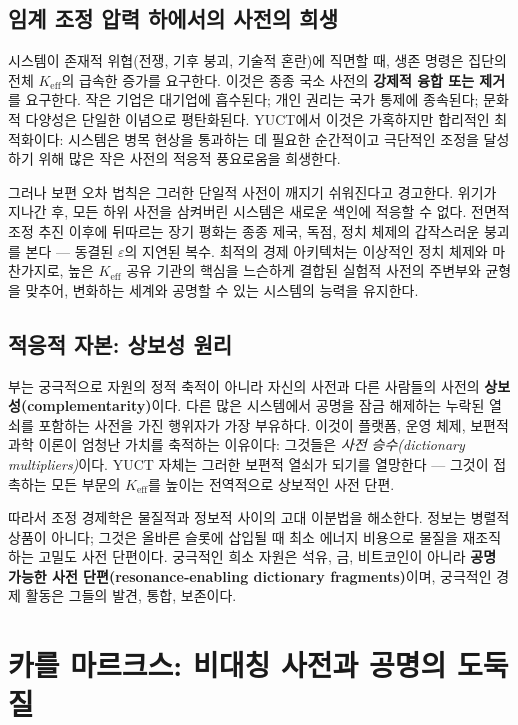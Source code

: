 \documentclass[12pt,a4paper]{article}
\newcommand{\Keff}{K_{\mathrm{eff}}}
\begin{document}
	\subsection{임계 조정 압력 하에서의 사전의 희생}
	
	시스템이 존재적 위협(전쟁, 기후 붕괴, 기술적 혼란)에 직면할 때, 생존 명령은 집단의 전체 \(\Keff\)의 급속한 증가를 요구한다. 이것은 종종 국소 사전의 \textbf{강제적 융합 또는 제거}를 요구한다. 작은 기업은 대기업에 흡수된다; 개인 권리는 국가 통제에 종속된다; 문화적 다양성은 단일한 이념으로 평탄화된다. YUCT에서 이것은 가혹하지만 합리적인 최적화이다: 시스템은 병목 현상을 통과하는 데 필요한 순간적이고 극단적인 조정을 달성하기 위해 많은 작은 사전의 적응적 풍요로움을 희생한다.
	
	그러나 보편 오차 법칙은 그러한 단일적 사전이 깨지기 쉬워진다고 경고한다. 위기가 지나간 후, 모든 하위 사전을 삼켜버린 시스템은 새로운 색인에 적응할 수 없다. 전면적 조정 추진 이후에 뒤따르는 장기 평화는 종종 제국, 독점, 정치 체제의 갑작스러운 붕괴를 본다 — 동결된 \(\varepsilon\)의 지연된 복수. 최적의 경제 아키텍처는 이상적인 정치 체제와 마찬가지로, 높은 \(\Keff\) 공유 기관의 핵심을 느슨하게 결합된 실험적 사전의 주변부와 균형을 맞추어, 변화하는 세계와 공명할 수 있는 시스템의 능력을 유지한다.
	
	\subsection{적응적 자본: 상보성 원리}
	
	부는 궁극적으로 자원의 정적 축적이 아니라 자신의 사전과 다른 사람들의 사전의 \textbf{상보성(complementarity)}이다. 다른 많은 시스템에서 공명을 잠금 해제하는 누락된 열쇠를 포함하는 사전을 가진 행위자가 가장 부유하다. 이것이 플랫폼, 운영 체제, 보편적 과학 이론이 엄청난 가치를 축적하는 이유이다: 그것들은 \emph{사전 승수(dictionary multipliers)}이다. YUCT 자체는 그러한 보편적 열쇠가 되기를 열망한다 — 그것이 접촉하는 모든 부문의 \(\Keff\)를 높이는 전역적으로 상보적인 사전 단편.
	
	따라서 조정 경제학은 물질적과 정보적 사이의 고대 이분법을 해소한다. 정보는 병렬적 상품이 아니다; 그것은 올바른 슬롯에 삽입될 때 최소 에너지 비용으로 물질을 재조직하는 고밀도 사전 단편이다. 궁극적인 희소 자원은 석유, 금, 비트코인이 아니라 \textbf{공명 가능한 사전 단편(resonance‑enabling dictionary fragments)}이며, 궁극적인 경제 활동은 그들의 발견, 통합, 보존이다.
	
	\section{카를 마르크스: 비대칭 사전과 공명의 도둑질}
	\label{sec:marx}
	
\end{document}
